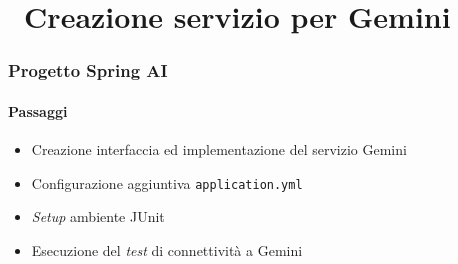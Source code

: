 \section{\faWrench\ Creazione servizio per Gemini} %
\label{sec:spring-ai-gemini-service}
%
\begin{frame}[t,fragile] \frametitle{Progetto Spring AI}
    \framesubtitle{Passaggi}
	\begin{itemize}
        \item[\alertedcircled{1}] Creazione interfaccia ed implementazione del servizio Gemini
        \item[\alertedcircled{2}] Configurazione aggiuntiva \texttt{application.yml}
        \item[\alertedcircled{3}] \textit{Setup} ambiente JUnit
        \item[\alertedcircled{4}] Esecuzione del \textit{test} di connettività a Gemini 
	\end{itemize}        
\end{frame}
%

